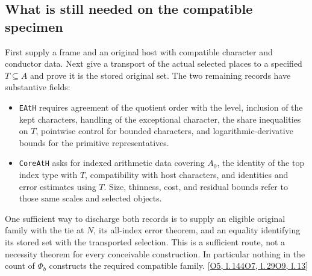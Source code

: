 \documentclass[12pt,letterpaper]{article}
\newcommand{\id}[1]{{\small\nolinkurl{#1}}}
\begin{document}
\subsection*{What is still needed on the compatible specimen}
First supply a frame and an original host with compatible character and conductor data. Next give a transport of the actual selected places to a specified $T\subseteq A$ and prove it is the stored original set. The two remaining records have substantive fields:
\begin{itemize}
\item \id{EAtH} requires agreement of the quotient order with the level, inclusion of the kept characters, handling of the exceptional character, the share inequalities on $T$, pointwise control for bounded characters, and logarithmic-derivative bounds for the primitive representatives.
\item \id{CoreAtH} asks for indexed arithmetic data covering $A_0$, the identity of the top index type with $T$, compatibility with host characters, and identities and error estimates using $T$. Size, thinness, cost, and residual bounds refer to those same scales and selected objects.
\end{itemize}
One sufficient way to discharge both records is to supply an eligible original family with the tie at $N$, its all-index error theorem, and an equality identifying its stored set with the transported selection. This is a sufficient route, not a necessity theorem for every conceivable construction. In particular nothing in the count of $\Phi_b$ constructs the required compatible family. {\footnotesize\sffamily\color{mute}[\href{https://github.com/nousentllc/riemann-hypothesis/blob/40e56bab026552e089d7afcfeff08d2defb9c005/src/Formalism/SharpRestriction/RamificationFrobenius/TotientGaloisClasses/ExplicitFormulaErrorOfHostConditions.lean#L144}{O5, l.\,144}\enspace \href{https://github.com/nousentllc/riemann-hypothesis/blob/40e56bab026552e089d7afcfeff08d2defb9c005/src/Development/AutomorphicArithmetic/PrimitiveCosets/CoreAtH.lean#L29}{O7, l.\,29}\enspace \href{https://github.com/nousentllc/riemann-hypothesis/blob/40e56bab026552e089d7afcfeff08d2defb9c005/src/Development/AutomorphicArithmetic/PrimitiveCosets/LevelGmLeOnFamilyScales.lean#L13}{O9, l.\,13}]}
\end{document}
